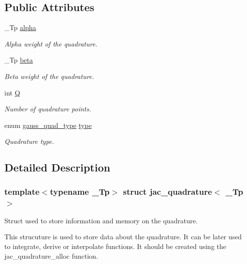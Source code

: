 \subsection*{Public Attributes}
\begin{DoxyCompactItemize}
\item 
\+\_\+\+Tp \hyperlink{structjac__quadrature_a24503b91f0dbdc3d3ab3bd802c990e68}{alpha}
\begin{DoxyCompactList}\small\item\em Alpha weight of the quadrature. \end{DoxyCompactList}\item 
\+\_\+\+Tp \hyperlink{structjac__quadrature_ad4fd571dd4977ed96b8155c79367ac41}{beta}
\begin{DoxyCompactList}\small\item\em Beta weight of the quadrature. \end{DoxyCompactList}\item 
int \hyperlink{structjac__quadrature_a91ae5ef05b9ea80951e40cc8a794c834}{Q}
\begin{DoxyCompactList}\small\item\em Number of quadrature points. \end{DoxyCompactList}\item 
enum \hyperlink{jacobi_8h_a58cc26f41a96f9220797038d2d3b4c8a}{gauss\+\_\+quad\+\_\+type} \hyperlink{structjac__quadrature_a9af6c3334c23994de4547b9d2631ce28}{type}
\begin{DoxyCompactList}\small\item\em Quadrature type. \end{DoxyCompactList}\end{DoxyCompactItemize}


\subsection{Detailed Description}
\subsubsection*{template$<$typename \+\_\+\+Tp$>$\newline
struct jac\+\_\+quadrature$<$ \+\_\+\+Tp $>$}

Struct used to store information and memory on the quadrature. 

This strucuture is used to store data about the quadrature. It can be later used to integrate, derive or interpolate functions. It should be created using the jac\+\_\+quadrature\+\_\+alloc function. 

